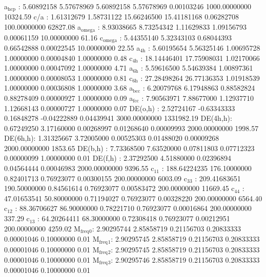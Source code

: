 \documentclass[11pt]{article}
\begin{document}
a\(_{\text{hcp}}\)   :   5.60892158   5.57678969   5.60892158   5.57678969   0.00103246 1000.00000000     10324.59
c/a     :   1.61312679   1.58731122  15.66246500  15.41181168   0.06282708 100.00000000     62827.08
a\(_{\text{omega}}\) :   8.93038665   8.73254342   1.11629833   1.09156793   0.00061159  10.00000000        61.16
c\(_{\text{omega}}\) :   5.44355140   5.32343103   0.68044393   0.66542888   0.00022545  10.00000000        22.55
a\(_{\text{4h}}\)    :   5.60195654   5.56325146   1.00695728   1.00000000   0.00004840   1.00000000         0.48
c\(_{\text{4h}}\)    :  18.14446401  17.75908031   1.02170066   1.00000000   0.00047092   1.00000000         4.71
a\(_{\text{6h}}\)    :   5.59616500   5.54639384   1.00897361   1.00000000   0.00008053   1.00000000         0.81
c\(_{\text{6h}}\)    :  27.28498264  26.77136353   1.01918539   1.00000000   0.00036808   1.00000000         3.68
a\(_{\text{bcc}}\)   :   6.20079768   6.17948863   0.88582824   0.88278409   0.00000927   1.00000000         0.09
a\(_{\text{fcc}}\)   :   7.90563971   7.88677000   1.12937710   1.12668143   0.00000727   1.00000000         0.07
DE(o,h) :   2.52724167  -0.63343333   0.16848278  -0.04222889   0.04439941 3000.00000000   1331982.19
DE(4h,h):   0.67249250   3.17160000   0.00268997   0.01268640   0.00009993 2000.00000000      1998.57
DE(6h,h):   1.31325667   3.72005000   0.00525303   0.01488020   0.00009268 2000.00000000      1853.65
DE(b,h) :   7.73368500   7.63520000   0.07811803   0.07712323   0.00000099   1.00000000         0.01
DE(f,h) :   2.37292500   4.51880000   0.02396894   0.04564444   0.00046983 2000.00000000      9396.55
c\(_{\text{11}}\)    : 188.64224235 176.10000000   0.82401713   0.76923077   0.00300155 200.00000000      6003.09
c\(_{\text{33}}\)    : 209.41683651 190.50000000   0.84561614   0.76923077   0.00583472 200.00000000     11669.45
c\(_{\text{44}}\)    :  47.01653541  50.80000000   0.71194027   0.76923077   0.00328220 200.00000000      6564.40
c\(_{\text{12}}\)    :  88.36706627  86.90000000   0.78221710   0.76923077   0.00016864 200.00000000       337.29
c\(_{\text{13}}\)    :  64.20264411  68.30000000   0.72308418   0.76923077   0.00212951 200.00000000      4259.02
M\(_{\text{freq}}\)\(_{\text{0}}\):   2.90295744   2.85858719   0.21156703   0.20833333   0.00001046   0.10000000         0.01
M\(_{\text{freq}}\)\(_{\text{1}}\):   2.90295745   2.85858719   0.21156703   0.20833333   0.00001046   0.10000000         0.01
M\(_{\text{freq}}\)\(_{\text{2}}\):   2.90295745   2.85858719   0.21156703   0.20833333   0.00001046   0.10000000         0.01
M\(_{\text{freq}}\)\(_{\text{3}}\):   2.90295746   2.85858719   0.21156703   0.20833333   0.00001046   0.10000000         0.01
\end{document}
